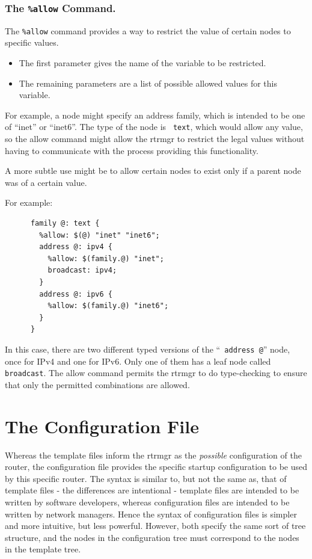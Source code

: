 \documentclass[11pt]{article}
\begin{document}
\subsubsection{The {\tt \%allow} Command.}
The {\tt \%allow} command provides a way to restrict the value of
certain nodes to specific values.
\begin{itemize}
\item The first parameter gives the name of the variable to be restricted.
\item The remaining parameters are a list of possible allowed values for
this variable.
\end{itemize}
For example, a node might specify an address family, which is intended
to be one of ``inet'' or ``inet6''.  The type of the node is {\tt
text}, which would allow any value, so the allow command might allow
the rtrmgr to restrict the legal values without having to
communicate with the process providing this functionality.

A more subtle use might be to allow certain nodes to exist only if a
parent node was of a certain value.

For example:
\begin{verbatim}
      family @: text {
        %allow: $(@) "inet" "inet6";
        address @: ipv4 {
          %allow: $(family.@) "inet";
          broadcast: ipv4;
        }
        address @: ipv6 {
          %allow: $(family.@) "inet6";
        }
      }
\end{verbatim}
In this case, there are two different typed versions of the ``{\tt
address @}'' node, once for IPv4 and one for IPv6.  Only one of them has
a leaf node called {\tt broadcast}.  The allow command permits the
rtrmgr to do type-checking to ensure that only the permitted
combinations are allowed.
\newpage
\section{The Configuration File}
Whereas the template files inform the rtrmgr as the {\it possible}
configuration of the router, the configuration file provides the
specific startup configuration to be used by this specific router.
The syntax is similar to, but not the same as, that of template files -
the differences are intentional - template files are intended to be
written by software developers, whereas configuration files are
intended to be written by network managers.  Hence the syntax of
configuration files is simpler and more intuitive, but less powerful.
However, both specify the same sort of tree structure, and the nodes
in the configuration tree must correspond to the nodes in the template
tree.
\end{document}

